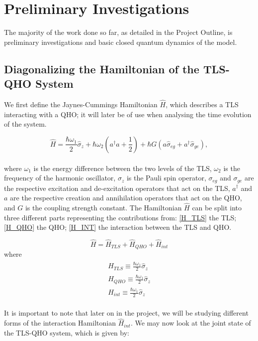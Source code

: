 \documentclass[12pt,a4paper]{article}
\begin{document}
{\section{Preliminary Investigations}}
The majority of the work done so far, as detailed in the Project Outline, is preliminary investigations and basic closed quantum dynamics of the model. 
\\
\subsection{\normalsize{Diagonalizing the Hamiltonian of the TLS-QHO System}}

We first define the Jaynes-Cummings\cite{JCHamiltonianDef} Hamiltonian\cite{Hagelstein2LSHO_Desc} $\hat{H}$, which describes a TLS interacting with a QHO; it will later be of use when analysing the time evolution of the system. 

\begin{equation}
    \hat{H} = \frac{\hbar\omega_1}{2}\hat{\sigma}_z + \hbar\omega_2(a^\dagger a + \frac{1}{2}) + \hbar G(a\hat{\sigma}_{eg} + a^\dagger\hat{\sigma}_{ge}),
\end{equation}
\\
where $\omega_1$ is the energy difference between the two levels of the TLS, $\omega_2$ is the frequency of the harmonic oscillator, $\sigma_z$ is the Pauli spin operator, $\sigma_{eg}$ and $\sigma_{ge}$ are the respective excitation and de-excitation operators that act on the TLS, $a^\dagger$ and $a$ are the respective creation and annihilation operators that act on the QHO, and $G$ is the coupling strength constant. The Hamiltonian $\hat{H}$ can be split into three different parts representing the contributions from: \eqref{H_TLS} the TLS; \eqref{H_QHO} the QHO; \eqref{H_INT} the interaction between the TLS and QHO. 

\begin{equation*}
    \hat{H} = \hat{H}_{TLS} + \hat{H}_{QHO} + \hat{H}_{int}
\end{equation*}
where 
\begin{align}
    \hat{H}_{TLS}\equiv \frac{\hbar\omega_1}{2}\hat{\sigma}_z \label{H_TLS}\\
    \hat{H}_{QHO}\equiv \frac{\hbar\omega_1}{2}\hat{\sigma}_z \label{H_QHO}\\
    \hat{H}_{int}\equiv \frac{\hbar\omega_1}{2}\hat{\sigma}_z \label{H_INT}
\end{align}
\\
It is important to note that later on in the project, we will be studying different forms of the interaction Hamiltonian $\hat{H}_{int}$.
We may now look at the joint state of the TLS-QHO system, which is given by:
\end{document}
